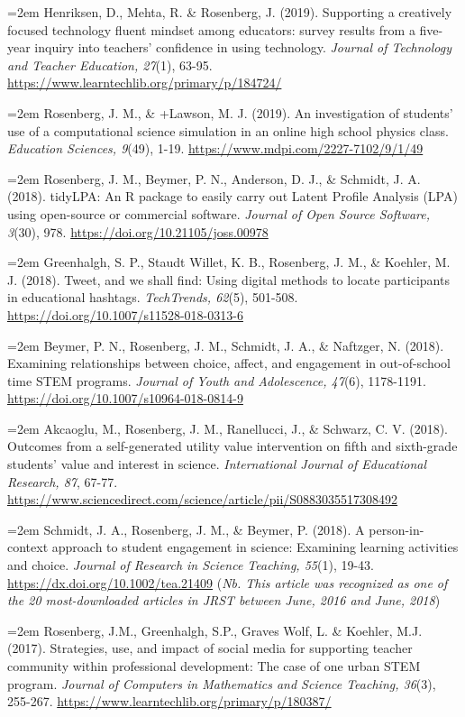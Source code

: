 \documentclass[
  14,
]{article}
\begin{document}
\hangindent=2em Henriksen, D., Mehta, R. \& Rosenberg, J. (2019).
Supporting a creatively focused technology fluent mindset among
educators: survey results from a five-year inquiry into teachers'
confidence in using technology. \emph{Journal of Technology and Teacher
Education, 27}(1), 63-95.
\url{https://www.learntechlib.org/primary/p/184724/}

\hangindent=2em Rosenberg, J. M., \& +Lawson, M. J. (2019). An
investigation of students' use of a computational science simulation in
an online high school physics class. \emph{Education Sciences, 9}(49),
1-19. \url{https://www.mdpi.com/2227-7102/9/1/49}

\hangindent=2em Rosenberg, J. M., Beymer, P. N., Anderson, D. J., \&
Schmidt, J. A. (2018). tidyLPA: An R package to easily carry out Latent
Profile Analysis (LPA) using open-source or commercial software.
\emph{Journal of Open Source Software, 3}(30), 978.
\url{https://doi.org/10.21105/joss.00978}

\hangindent=2em Greenhalgh, S. P., Staudt Willet, K. B., Rosenberg, J.
M., \& Koehler, M. J. (2018). Tweet, and we shall find: Using digital
methods to locate participants in educational hashtags.
\emph{TechTrends, 62}(5), 501-508.
\url{https://doi.org/10.1007/s11528-018-0313-6}

\hangindent=2em Beymer, P. N., Rosenberg, J. M., Schmidt, J. A., \&
Naftzger, N. (2018). Examining relationships between choice, affect, and
engagement in out-of-school time STEM programs. \emph{Journal of Youth
and Adolescence, 47}(6), 1178-1191.
\url{https://doi.org/10.1007/s10964-018-0814-9}

\hangindent=2em Akcaoglu, M., Rosenberg, J. M., Ranellucci, J., \&
Schwarz, C. V. (2018). Outcomes from a self-generated utility value
intervention on fifth and sixth-grade students' value and interest in
science. \emph{International Journal of Educational Research, 87},
67-77.
\url{https://www.sciencedirect.com/science/article/pii/S0883035517308492}

\hangindent=2em Schmidt, J. A., Rosenberg, J. M., \& Beymer, P. (2018).
A person-in-context approach to student engagement in science: Examining
learning activities and choice. \emph{Journal of Research in Science
Teaching, 55}(1), 19-43. \url{https://dx.doi.org/10.1002/tea.21409}
(\emph{Nb. This article was recognized as one of the 20 most-downloaded
articles in JRST between June, 2016 and June, 2018})

\hangindent=2em Rosenberg, J.M., Greenhalgh, S.P., Graves Wolf, L. \&
Koehler, M.J. (2017). Strategies, use, and impact of social media for
supporting teacher community within professional development: The case
of one urban STEM program. \emph{Journal of Computers in Mathematics and
Science Teaching, 36}(3), 255-267.
\url{https://www.learntechlib.org/primary/p/180387/}
\end{document}
